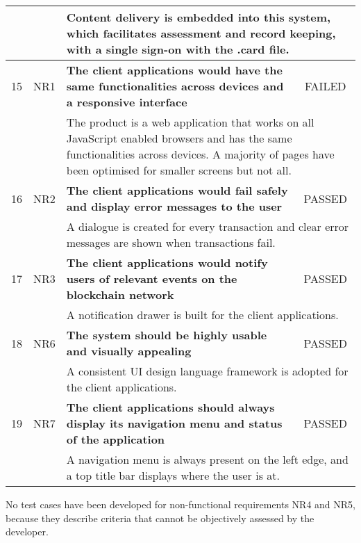 \begin{table}[!ht]
\begin{tabularx}{\textwidth}{|c|c|X|c|}
		\hline
		   &      & \multicolumn{2}{X|}{Content delivery is embedded into this system, which facilitates
			assessment and record keeping, with a single sign-on with the .card file.}                                                            \\
        \hline
        15 & NR1 & \textbf{The client applications would have the same functionalities
        across devices and a responsive interface} & \cellcolor{pink}FAILED \\
		\hline
           &      & \multicolumn{2}{X|}{The product is a web application that works on all 
           JavaScript enabled browsers and has the same functionalities across devices.
           A majority of pages have been optimised for smaller screens but not all.}      \\
        \hline
        16 & NR2 & \textbf{The client applications would fail safely and display error messages
		to the user} & \cellcolor{green}PASSED \\
		\hline
           &      & \multicolumn{2}{X|}{A dialogue is created for every transaction 
           and clear error messages are shown when transactions fail.}      \\
        \hline
        17 & NR3 & \textbf{The client applications would notify users of relevant
        events on the blockchain network} & \cellcolor{green}PASSED \\
		\hline
           &      & \multicolumn{2}{X|}{A notification drawer is built for the client applications.}      \\
        \hline
        18 & NR6 & \textbf{The system should be highly usable and visually appealing} & \cellcolor{green}PASSED \\
		\hline
           &      & \multicolumn{2}{X|}{A consistent UI design language framework is adopted for the client applications.}      \\
        \hline
        19 & NR7 & \textbf{The client applications should always display its navigation menu and status of the application} & \cellcolor{green}PASSED \\
		\hline
           &      & \multicolumn{2}{X|}{A navigation menu is always present on the left edge, and a top title bar displays where the user is at.}      \\
        \hline
	\end{tabularx}
\end{table}

No test cases have been developed for non-functional requirements NR4 and NR5, 
because they describe criteria that cannot be objectively assessed by the developer.